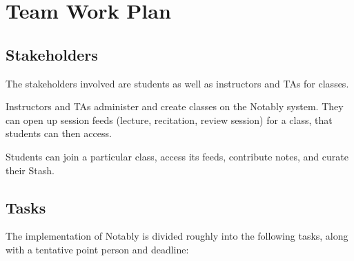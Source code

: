 \documentclass{article}
\begin{document}
\section*{Team Work Plan}
\subsection*{Stakeholders}
The stakeholders involved are students as well as instructors and TAs for classes. 

Instructors and TAs administer and create classes on the Notably system. They can open up session feeds (lecture, recitation, review session) for a class, that students can then access.

Students can join a particular class, access its feeds, contribute notes, and curate their Stash.


\subsection*{Tasks}
The implementation of Notably is divided roughly into the following tasks, along with a tentative point person and deadline:
\end{document}
